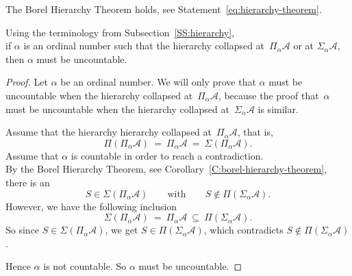 \begin{cor}
\label{C:borel-hierarchy-theorem}
The Borel Hierarchy Theorem holds,
see Statement~\eqref{eq:hierarchy-theorem}.
\end{cor}

\begin{prop}
\label{P:no-countable-collapse}
Using the terminology from Subsection~\ref{SS:hierarchy},\\
if $\alpha$ is an ordinal number
such that the hierarchy collapsed at~$\Pi_\alpha \mathcal{A}$
or at $\Sigma_\alpha \mathcal{A} $,\\
then $\alpha$ must be uncountable.
\end{prop}
\begin{proof}
Let $\alpha$ be an ordinal number.
We will only prove that
$\alpha$ must be uncountable when
 the hierarchy collapsed at~$\Pi_\alpha\mathcal{A}$,
because the
proof that~$\alpha$
must be uncountable when the hierarchy collapsed
at~$\Sigma_\alpha\mathcal{A}$ is similar.

Assume that the hierarchy hierarchy collapsed at~$\Pi_\alpha\mathcal{A}$,
that is,
\begin{equation*}
\Pi(\Pi_\alpha \mathcal{A}) 
\ =\ 
\Pi_\alpha \mathcal{A}
\ =\ 
\Sigma(\Pi_\alpha \mathcal{A}).
\end{equation*}
Assume that $\alpha$ is countable in order to reach a contradiction.\\
By the Borel Hierarchy Theorem,
see Corollary~\eqref{C:borel-hierarchy-theorem},
there is an 
\begin{equation*}
S\in \Sigma(\Pi_\alpha \mathcal{A})
\qquad\text{with}\qquad
S\notin \Pi(\Sigma_\alpha \mathcal{A}).
\end{equation*}
However,
we have the following inclusion
\begin{equation*}
\Sigma(\Pi_\alpha \mathcal{A}) \ = \ 
\Pi_\alpha \mathcal{A} \ \subseteq\ \Pi(\Sigma_\alpha \mathcal{A}).
\end{equation*}
So since $S\in \Sigma(\Pi_\alpha\mathcal{A})$,
we get $S\in \Pi(\Sigma_\alpha \mathcal{A})$,
which contradicts $S\notin \Pi(\Sigma_\alpha\mathcal{A})$.

Hence $\alpha$ is not countable.
So $\alpha$ must be uncountable.
\end{proof}









































